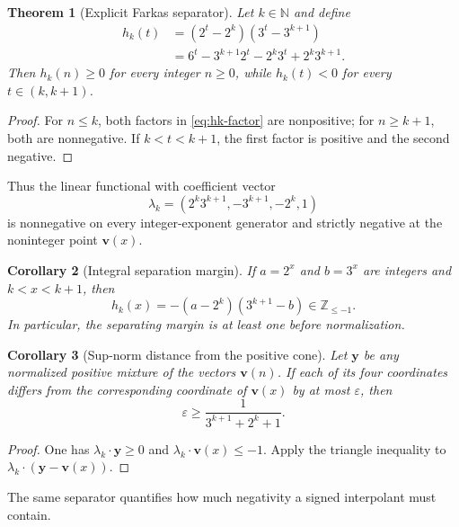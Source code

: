 \documentclass[11pt]{article}
\newtheorem{theorem}{Theorem}[section]
\newtheorem{corollary}[theorem]{Corollary}
\theoremstyle{definition}
\newcommand{\N}{\mathbb N}
\newcommand{\Z}{\mathbb Z}
\newcommand{\vct}[1]{\boldsymbol{#1}}
\begin{document}
\begin{theorem}[Explicit Farkas separator]\label{thm:separator}
Let $k\in\N$ and define
\begin{align}
 h_k(t)
 &=(2^t-2^k)(3^t-3^{k+1})\label{eq:hk-factor}\\
 &=6^t-3^{k+1}2^t-2^k3^t+2^k3^{k+1}.\label{eq:hk-linear}
\end{align}
Then $h_k(n)\ge0$ for every integer $n\ge0$, while $h_k(t)<0$ for every $t\in(k,k+1)$.
\end{theorem}
\begin{proof}
For $n\le k$, both factors in \eqref{eq:hk-factor} are nonpositive; for $n\ge k+1$, both are nonnegative.  If $k<t<k+1$, the first factor is positive and the second negative.
\end{proof}

Thus the linear functional with coefficient vector
\[
 \lambda_k=(2^k3^{k+1},-3^{k+1},-2^k,1)
\]
is nonnegative on every integer-exponent generator and strictly negative at the noninteger point $\vct v(x)$.

\begin{corollary}[Integral separation margin]\label{cor:integral-margin}
If $a=2^x$ and $b=3^x$ are integers and $k<x<k+1$, then
\begin{equation}\label{eq:margin}
 h_k(x)=-(a-2^k)(3^{k+1}-b)\in\Z_{\le-1}.
\end{equation}
In particular, the separating margin is at least one before normalization.
\end{corollary}

\begin{corollary}[Sup-norm distance from the positive cone]\label{cor:distance}
Let $\vct y$ be any normalized positive mixture of the vectors $\vct v(n)$.  If each of its four coordinates differs from the corresponding coordinate of $\vct v(x)$ by at most $\varepsilon$, then
\[
 \varepsilon\ge \frac{1}{3^{k+1}+2^k+1}.
\]
\end{corollary}
\begin{proof}
One has $\lambda_k\cdot\vct y\ge0$ and $\lambda_k\cdot\vct v(x)\le-1$.  Apply the triangle inequality to $\lambda_k\cdot(\vct y-\vct v(x))$.
\end{proof}

The same separator quantifies how much negativity a signed interpolant must contain.
\end{document}
